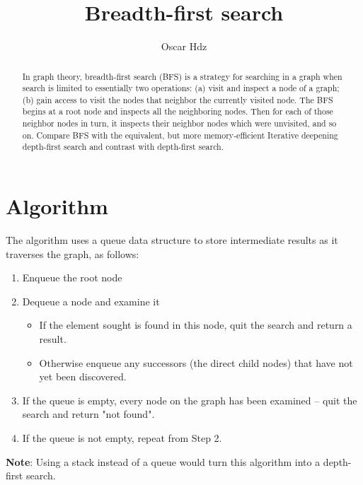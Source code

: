 \documentclass{article}
\title{Breadth-first search}
\author{Oscar Hdz}
\begin{document}
\maketitle
\tableofcontents

\begin{abstract}
In graph theory, breadth-first search (BFS) is a strategy for searching in a graph when search is limited to essentially two operations: (a) visit and inspect a node of a graph; (b) gain access to visit the nodes that neighbor the currently visited node. The BFS begins at a root node and inspects all the neighboring nodes. Then for each of those neighbor nodes in turn, it inspects their neighbor nodes which were unvisited, and so on. Compare BFS with the equivalent, but more memory-efficient Iterative deepening depth-first search and contrast with depth-first search.
\end{abstract}

\section{Algorithm}

The algorithm uses a queue data structure to store intermediate results as it traverses the graph, as follows:

\begin{enumerate}
\item Enqueue the root node
\item Dequeue a node and examine it
    \begin{itemize}
      \item If the element sought is found in this node, quit the search and return a result.
      \item Otherwise enqueue any successors (the direct child nodes) that have not yet been discovered.  
    \end{itemize}
\item If the queue is empty, every node on the graph has been examined – quit the search and return "not found".
\item If the queue is not empty, repeat from Step 2.

\end{enumerate}
\textbf{Note}: Using a stack instead of a queue would turn this algorithm into a depth-first search.

\end{document}
